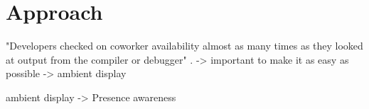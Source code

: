 \chapter{Approach}

 "Developers checked on coworker availability almost as many times as they looked at output from the compiler or debugger" \cite{ko2007information}. -> important to make it as easy as possible -> ambient display
 
 ambient display -> Presence awareness